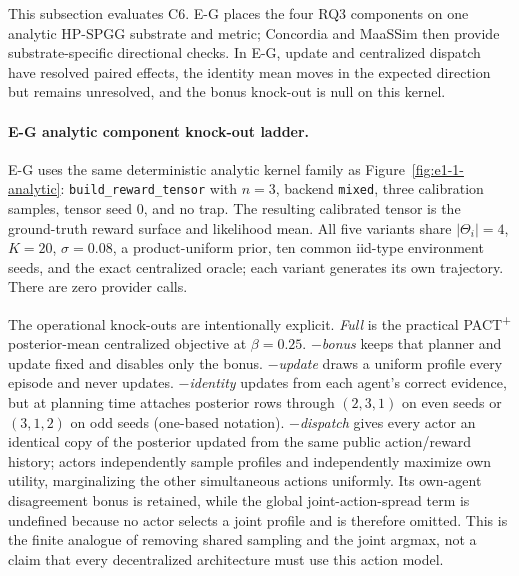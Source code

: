 This subsection evaluates C6. E-G places the four RQ3 components on one analytic HP-SPGG substrate and metric; Concordia and MaaSSim then provide substrate-specific directional checks. In E-G, update and centralized dispatch have resolved paired effects, the identity mean moves in the expected direction but remains unresolved, and the bonus knock-out is null on this kernel.

\paragraph{E-G analytic component knock-out ladder.}
E-G uses the same deterministic analytic kernel family as Figure~\ref{fig:e1-1-analytic}: \texttt{build\_reward\_tensor} with $n=3$, backend \texttt{mixed}, three calibration samples, tensor seed $0$, and no trap. The resulting calibrated tensor is the ground-truth reward surface and likelihood mean. All five variants share $|\Theta_i|=4$, $K=20$, $\sigma=0.08$, a product-uniform prior, ten common iid-type environment seeds, and the exact centralized oracle; each variant generates its own trajectory. There are zero provider calls.

The operational knock-outs are intentionally explicit. \emph{Full} is the practical PACT\textsuperscript{+} posterior-mean centralized objective at $\beta=0.25$. \emph{$-$bonus} keeps that planner and update fixed and disables only the bonus. \emph{$-$update} draws a uniform profile every episode and never updates. \emph{$-$identity} updates from each agent's correct evidence, but at planning time attaches posterior rows through $(2,3,1)$ on even seeds or $(3,1,2)$ on odd seeds (one-based notation). \emph{$-$dispatch} gives every actor an identical copy of the posterior updated from the same public action/reward history; actors independently sample profiles and independently maximize own utility, marginalizing the other simultaneous actions uniformly. Its own-agent disagreement bonus is retained, while the global joint-action-spread term is undefined because no actor selects a joint profile and is therefore omitted. This is the finite analogue of removing shared sampling and the joint argmax, not a claim that every decentralized architecture must use this action model.

